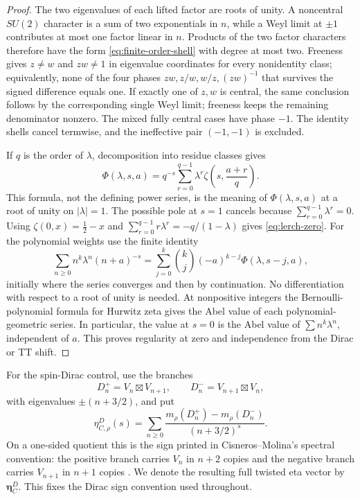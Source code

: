 \documentclass[11pt]{article}
\theoremstyle{definition}
\begin{document}
\begin{proof}
The two eigenvalues of each lifted factor are roots of unity.  A noncentral
$SU(2)$ character is a sum of two exponentials in $n$, while a Weyl limit at
$\pm1$ contributes at most one factor linear in $n$.  Products of the two
factor characters therefore have the form
\eqref{eq:finite-order-shell} with degree at most two.  Freeness gives
$z\ne w$ and $zw\ne1$ in eigenvalue coordinates for every nonidentity class;
equivalently, none of the four phases $zw,z/w,w/z,(zw)^{-1}$ that survives
the signed difference equals one.  If exactly one of $z,w$ is central, the
same conclusion follows by the corresponding single Weyl limit; freeness
keeps the remaining denominator nonzero.  The mixed fully central cases have
phase $-1$.
The identity shells cancel termwise, and the ineffective pair $(-1,-1)$ is
excluded.

If $q$ is the order of $\lambda$, decomposition into residue classes gives
\begin{equation}
 \Phi(\lambda,s,a)=q^{-s}\sum_{r=0}^{q-1}
 \lambda^r\zeta\!\left(s,\frac{a+r}{q}\right).
 \label{eq:lerch-hurwitz-decomposition}
\end{equation}
This formula, not the defining power series, is the meaning of
$\Phi(\lambda,s,a)$ at a root of unity on $|\lambda|=1$.
The possible pole at $s=1$ cancels because
$\sum_{r=0}^{q-1}\lambda^r=0$.  Using
$\zeta(0,x)=\tfrac12-x$ and
$\sum_{r=0}^{q-1}r\lambda^r=-q/(1-\lambda)$ gives
\eqref{eq:lerch-zero}.  For the polynomial weights use the finite identity
\[
 \sum_{n\geq0}n^k\lambda^n(n+a)^{-s}
 =\sum_{j=0}^k\binom{k}{j}(-a)^{k-j}\Phi(\lambda,s-j,a),
\]
initially where the series converges and then by continuation.  No
differentiation with respect to a root of unity is needed.  At nonpositive
integers the Bernoulli-polynomial formula for Hurwitz zeta gives the Abel
value of each polynomial-geometric series.  In particular, the value at
$s=0$ is the Abel value of $\sum n^k\lambda^n$, independent of $a$.
This proves regularity at zero and independence from the Dirac or TT shift.
\end{proof}

For the spin-Dirac control, use the branches
\begin{equation}
 D_n^+=V_n\boxtimes V_{n+1},\qquad
 D_n^-=V_{n+1}\boxtimes V_n,
 \label{eq:dirac-branches}
\end{equation}
with eigenvalues $\pm(n+3/2)$, and put
\begin{equation}
 \eta^D_{C,\rho}(s)=\sum_{n\geq0}
 \frac{m_\rho(D_n^+)-m_\rho(D_n^-)}{(n+3/2)^s}.
 \label{eq:dirac-eta-definition}
\end{equation}
On a one-sided quotient this is the sign printed in Cisneros--Molina's
spectral convention: the positive branch carries $V_n$ in $n+2$ copies and
the negative branch carries $V_{n+1}$ in $n+1$ copies
\cite{CisnerosMolina2001}.  We denote the resulting full twisted eta vector
by $\boldsymbol\eta^D_C$.  This fixes the Dirac sign convention used
throughout.
\end{document}
